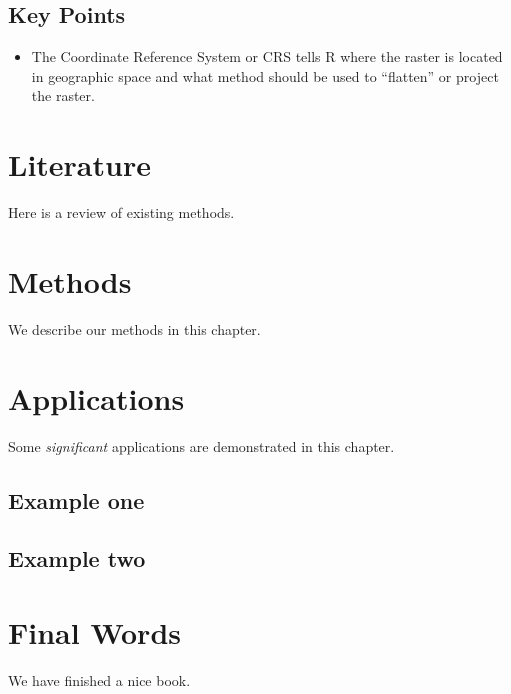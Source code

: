 \documentclass[]{book}
\providecommand{\tightlist}{%
  \setlength{\itemsep}{0pt}\setlength{\parskip}{0pt}}
\theoremstyle{definition}
\theoremstyle{definition}
\theoremstyle{definition}
\theoremstyle{remark}
\begin{document}
\section{Key Points}\label{key-points}

\begin{itemize}
\tightlist
\item
  The Coordinate Reference System or CRS tells R where the raster is
  located in geographic space and what method should be used to
  ``flatten'' or project the raster.
\end{itemize}

\chapter{Literature}\label{literature}

Here is a review of existing methods.

\chapter{Methods}\label{methods}

We describe our methods in this chapter.

\chapter{Applications}\label{applications}

Some \emph{significant} applications are demonstrated in this chapter.

\section{Example one}\label{example-one}

\section{Example two}\label{example-two}

\chapter{Final Words}\label{final-words}

We have finished a nice book.
\end{document}
